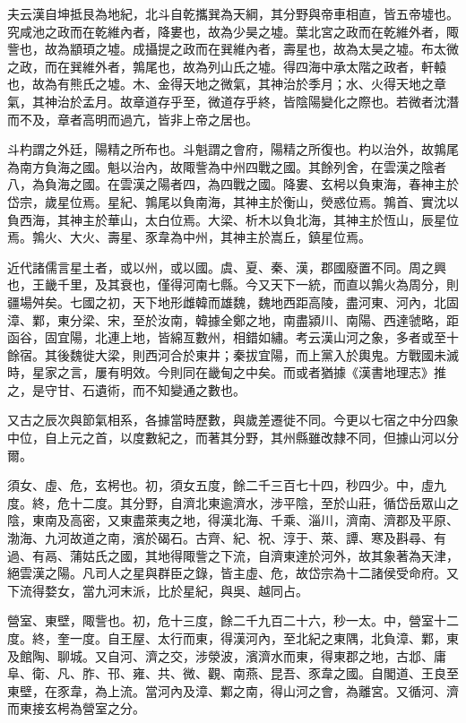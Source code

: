 \begin{pinyinscope}
 夫云漢自坤抵艮為地紀，北斗自乾攜巽為天綱，其分野與帝車相直，皆五帝墟也。究咸池之政而在乾維內者，降婁也，故為少昊之墟。葉北宮之政而在乾維外者，陬訾也，故為顓頊之墟。成攝提之政而在巽維內者，壽星也，故為太昊之墟。布太微之政，而在巽維外者，鶉尾也，故為列山氏之墟。得四海中承太階之政者，軒轅也，故為有熊氏之墟。木、金得天地之微氣，其神治於季月；水、火得天地之章氣，其神治於孟月。故章道存乎至，微道存乎終，皆陰陽變化之際也。若微者沈潛而不及，章者高明而過亢，皆非上帝之居也。



 斗杓謂之外廷，陽精之所布也。斗魁謂之會府，陽精之所復也。杓以治外，故鶉尾為南方負海之國。魁以治內，故陬訾為中州四戰之國。其餘列舍，在雲漢之陰者八，為負海之國。在雲漢之陽者四，為四戰之國。降婁、玄枵以負東海，春神主於岱宗，歲星位焉。星紀、鶉尾以負南海，其神主於衡山，熒惑位焉。鶉首、實沈以負西海，其神主於華山，太白位焉。大梁、析木以負北海，其神主於恆山，辰星位焉。鶉火、大火、壽星、豕韋為中州，其神主於嵩丘，鎮星位焉。



 近代諸儒言星土者，或以州，或以國。虞、夏、秦、漢，郡國廢置不同。周之興也，王畿千里，及其衰也，僅得河南七縣。今又天下一統，而直以鶉火為周分，則疆場舛矣。七國之初，天下地形雌韓而雄魏，魏地西距高陵，盡河東、河內，北固漳、鄴，東分梁、宋，至於汝南，韓據全鄭之地，南盡潁川、南陽、西達虢略，距函谷，固宜陽，北連上地，皆綿亙數州，相錯如繡。考云漢山河之象，多者或至十餘宿。其後魏徙大梁，則西河合於東井；秦拔宜陽，而上黨入於輿鬼。方戰國未滅時，星家之言，屢有明效。今則同在畿甸之中矣。而或者猶據《漢書地理志》推之，是守甘、石遺術，而不知變通之數也。



 又古之辰次與節氣相系，各據當時歷數，與歲差遷徙不同。今更以七宿之中分四象中位，自上元之首，以度數紀之，而著其分野，其州縣雖改隸不同，但據山河以分爾。



 須女、虛、危，玄枵也。初，須女五度，餘二千三百七十四，秒四少。中，虛九度。終，危十二度。其分野，自濟北東逾濟水，涉平陰，至於山莊，循岱岳眾山之陰，東南及高密，又東盡萊夷之地，得漢北海、千乘、淄川，濟南、濟郡及平原、渤海、九河故道之南，濱於碣石。古齊、紀、祝、淳于、萊、譚、寒及斟尋、有過、有鬲、蒲姑氏之國，其地得陬訾之下流，自濟東達於河外，故其象著為天津，絕雲漢之陽。凡司人之星與群臣之錄，皆主虛、危，故岱宗為十二諸侯受命府。又下流得婺女，當九河末派，比於星紀，與吳、越同占。



 營室、東壁，陬訾也。初，危十三度，餘二千九百二十六，秒一太。中，營室十二度。終，奎一度。自王屋、太行而東，得漢河內，至北紀之東隅，北負漳、鄴，東及館陶、聊城。又自河、濟之交，涉滎波，濱濟水而東，得東郡之地，古邶、庸阜、衛、凡、胙、邗、雍、共、微、觀、南燕、昆吾、豕韋之國。自閣道、王良至東壁，在豕韋，為上流。當河內及漳、鄴之南，得山河之會，為離宮。又循河、濟而東接玄枵為營室之分。




\end{pinyinscope}
